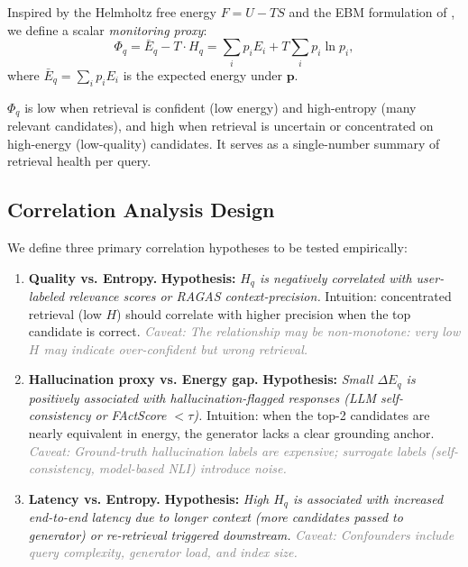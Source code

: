\documentclass[11pt,a4paper]{article}
\newcommand{\hypothesis}[1]{\textbf{Hypothesis:} \textit{#1}}
\newcommand{\caveat}[1]{\textcolor{gray}{\small\textit{Caveat: #1}}}
\theoremstyle{definition}
\begin{document}
Inspired by the Helmholtz free energy $F = U - TS$ and the EBM
formulation of \citet{liu2020ebm}, we define a scalar
\emph{monitoring proxy}:
\begin{equation}
  \Phi_q = \bar{E}_q - T \cdot H_q
         = \sum_i p_i E_i + T \sum_i p_i \ln p_i,
  \label{eq:fscalar}
\end{equation}
where $\bar{E}_q = \sum_i p_i E_i$ is the expected energy under $\mathbf{p}$.

$\Phi_q$ is low when retrieval is confident (low energy) and high-entropy
(many relevant candidates), and high when retrieval is uncertain or
concentrated on high-energy (low-quality) candidates.
It serves as a single-number summary of retrieval health per query.

\subsection{Correlation Analysis Design}
\label{sec:correlation}

We define three primary correlation hypotheses to be tested empirically:

\begin{enumerate}
  \item \textbf{Quality vs. Entropy.}
    \hypothesis{$H_q$ is negatively correlated with user-labeled
    relevance scores or RAGAS context-precision.}
    Intuition: concentrated retrieval (low $H$) should correlate
    with higher precision when the top candidate is correct.
    \caveat{The relationship may be non-monotone: very low $H$ may
    indicate over-confident but wrong retrieval.}

  \item \textbf{Hallucination proxy vs. Energy gap.}
    \hypothesis{Small $\Delta E_q$ is positively associated with
    hallucination-flagged responses (LLM self-consistency or
    FActScore $< \tau$).}
    Intuition: when the top-2 candidates are nearly equivalent in
    energy, the generator lacks a clear grounding anchor.
    \caveat{Ground-truth hallucination labels are expensive; surrogate
    labels (self-consistency, model-based NLI) introduce noise.}

  \item \textbf{Latency vs. Entropy.}
    \hypothesis{High $H_q$ is associated with increased end-to-end
    latency due to longer context (more candidates passed to generator)
    or re-retrieval triggered downstream.}
    \caveat{Confounders include query complexity, generator load, and
    index size.}
\end{enumerate}
\end{document}
